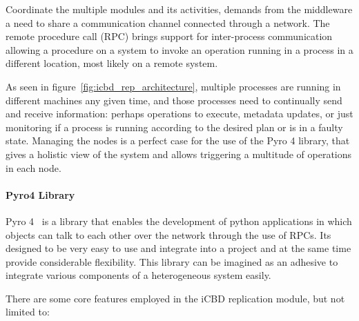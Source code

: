 Coordinate the multiple modules and its activities, demands from the middleware a need to share a communication channel connected through a network. 
The remote procedure call (RPC) brings support for inter-process communication allowing a procedure on a system to invoke an operation running in a process in a different location, most likely on a remote system.

As seen in figure~\ref{fig:icbd_rep_architecture}, multiple processes are running in different machines any given time, and those processes need to continually send and receive information: perhaps operations to execute, metadata updates, or just monitoring if a process is running according to the desired plan or is in a faulty state.
Managing the nodes is a perfect case for the use of the Pyro 4 library, that gives a holistic view of the system and allows triggering a multitude of operations in each node.


\paragraph{Pyro4 Library}
\label{par:rep_pyro4}
Pyro 4~\cite{pyro4} is a library that enables the development of python applications in which objects can talk to each other over the network through the use of RPCs. Its designed to be very easy to use and integrate into a project and at the same time provide considerable flexibility. This library can be imagined as an adhesive to integrate various components of a heterogeneous system easily.

There are some core features employed in the iCBD replication module, but not limited to:


